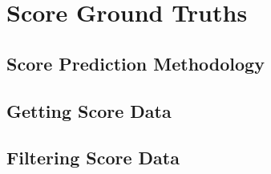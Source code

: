 \chapter{Score Ground Truths}\label{ch:ground-truths}


\section{Score Prediction Methodology}\label{sec:score-prediction-methodology}


\section{Getting Score Data}\label{sec:getting-score-data}



\section{Filtering Score Data}\label{sec:filtering-score-data}

